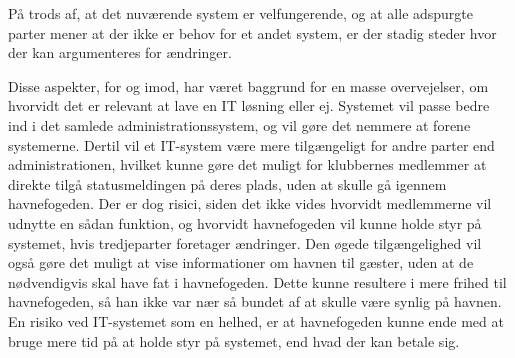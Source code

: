 På trods af, at det nuværende system er velfungerende, og at alle adspurgte parter mener at der ikke er behov for et andet system, er der stadig steder hvor der kan argumenteres for ændringer.


Disse aspekter, for og imod, har været baggrund for en masse overvejelser, om hvorvidt det er relevant at lave en IT løsning eller ej. Systemet vil passe bedre ind i det samlede administrationssystem, og vil gøre det nemmere at forene systemerne. Dertil vil et IT-system være mere tilgængeligt for andre parter end administrationen, hvilket kunne gøre det muligt for klubbernes medlemmer at direkte tilgå statusmeldingen på deres plads, uden at skulle gå igennem havnefogeden. Der er dog risici, siden det ikke vides hvorvidt medlemmerne vil udnytte en sådan funktion, og hvorvidt havnefogeden vil kunne holde styr på systemet, hvis tredjeparter foretager ændringer. Den øgede tilgængelighed vil også gøre det muligt at vise informationer om havnen til gæster, uden at de nødvendigvis skal have fat i havnefogeden. Dette kunne resultere i mere frihed til havnefogeden, så han ikke var nær så bundet af at skulle være synlig på havnen. En risiko ved IT-systemet som en helhed, er at havnefogeden kunne ende med at bruge mere tid på at holde styr på systemet, end hvad der kan betale sig.

